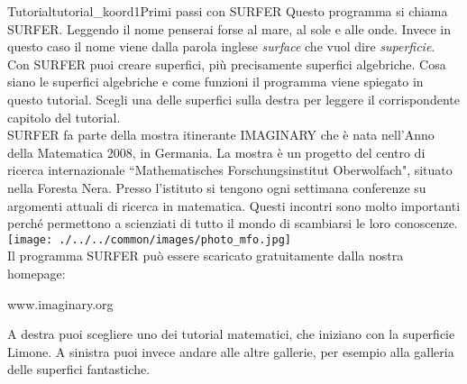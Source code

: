 \begin{surferIntroPage}{Tutorial}{tutorial_koord1}{Primi passi con SURFER}
Questo programma si chiama SURFER. Leggendo il nome penserai forse al mare,  al sole e alle onde. Invece in questo caso il nome viene dalla parola inglese {\it surface} che vuol dire {\it superficie}.
\\
Con SURFER puoi creare superfici, pi\`u precisamente superfici algebriche. Cosa siano le superfici algebriche e come funzioni il programma viene spiegato in questo tutorial. Scegli una delle superfici sulla destra per leggere il corrispondente capitolo del tutorial.\\
SURFER fa parte della mostra itinerante IMAGINARY che \`e nata nell'Anno della Matematica 2008, in Germania. La mostra \`e un progetto del centro di ricerca internazionale ``Mathematisches Forschungsinstitut Oberwolfach", situato nella Foresta Nera.  Presso l'istituto  si tengono ogni settimana conferenze su argomenti attuali di ricerca in matematica. Questi incontri sono molto importanti perch\'e permettono a scienziati di tutto il mondo di scambiarsi le loro conoscenze.\\
\vspace{0.2cm} \hspace{3.5cm}\texttt{[image: ./../../common/images/photo\_mfo.jpg]}\\
Il programma SURFER pu\`o essere scaricato gratuitamente dalla nostra homepage:\\
\begin{centering}
www.imaginary.org\\
\end{centering}
 \vspace{0.2cm}
A destra puoi scegliere uno dei tutorial matematici, che iniziano con la superficie Limone. A sinistra puoi invece andare alle altre gallerie, per esempio alla galleria delle superfici fantastiche.
\end{surferIntroPage}


